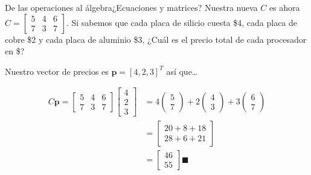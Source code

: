 \documentclass[spanish, c]{beamer}
\begin{document}
\begin{frame}{De las operaciones al álgebra}{¿Ecuaciones y matrices?}
    Nuestra nueva $C$ es ahora
    $C = \begin{bmatrix*}
        5 & 4 & 6 \\
        7 & 3 & 7
    \end{bmatrix*}$.
    Si sabemos que cada placa de silicio cuesta \$4, cada placa de cobre \$2 y cada placa de aluminio \$3, ¿Cuál es el precio total de cada procesador en \$? \pause

    \bigskip

    Nuestro vector de precios es $\mathbf{p} = [4, 2, 3]^T$ así que\dots \pause

    \bigskip

    \begin{align*}
        C\mathbf{p} =
        \begin{bmatrix*}
            5 & 4 & 6 \\
            7 & 3 & 7
        \end{bmatrix*}
        \begin{bmatrix*}
            4 \\ 2 \\ 3    
        \end{bmatrix*} & = 4 \begin{pmatrix*} 5 \\ 7 \end{pmatrix*} + 2 \begin{pmatrix*} 4 \\ 3 \end{pmatrix*} + 3 \begin{pmatrix*} 6 \\ 7 \end{pmatrix*} \\
        & = \begin{bmatrix*} 20 + 8 + 18 \\ 28 + 6 + 21 \end{bmatrix*} \\
        & = \begin{bmatrix*} 46 \\ 55 \end{bmatrix*} \blacksquare
    \end{align*}

\end{frame}
\end{document}
